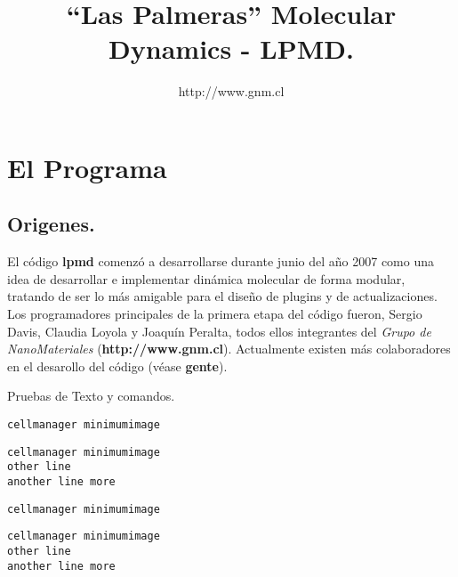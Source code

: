 \documentclass[a4paper,10pt]{scrbook}
\newcommand{\lpmd}{\textbf{lpmd }}
\newcommand{\control}[1]{\begin{center}\begin{minipage}{10cm}\texttt{#1}\end{minipage}\end{center}}
\begin{document}
\author{http://www.gnm.cl}
\title{``Las Palmeras'' Molecular Dynamics - \textbf{LPMD}.}
\maketitle

\tableofcontents
\chapter{El Programa}
\label{chap:lpmd}

\section{Origenes.}

El c\'odigo \lpmd comenz\'o a desarrollarse durante junio del a\~no 2007 como una idea de desarrollar e implementar din\'amica molecular de forma modular, tratando de ser lo m\'as amigable para el dise\~no de plugins y de actualizaciones. Los programadores principales de la primera etapa del c\'odigo fueron, Sergio Davis, Claudia Loyola y Joaqu\'in Peralta, todos ellos integrantes del \textit{Grupo de NanoMateriales} (\textbf{http://www.gnm.cl}). Actualmente existen m\'as colaboradores en el desarollo del c\'odigo (v\'ease \textbf{gente}).

Pruebas de Texto y comandos.

\begin{center}
\texttt{cellmanager minimumimage}
\end{center}

\control{cellmanager minimumimage \\ other line \\ another line more}


\begin{minipage}[c]{10cm}
 \texttt{cellmanager minimumimage}
\end{minipage}

\begin{center}
 \begin{minipage}[c]{5cm}
 \texttt{cellmanager minimumimage \\ other line \\ another line more}
\end{minipage}
\end{center}
\end{document}
